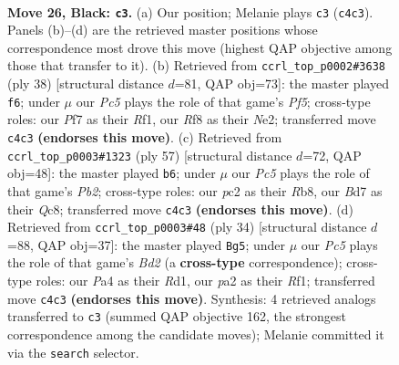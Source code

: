 \documentclass[11pt]{article}
\begin{document}
\clearpage

\begin{figure}[p]\centering
\begin{subfigure}{0.46\textwidth}\centering
\resizebox{\linewidth}{!}{%
\newchessgame
\chessboard[
  setfen={1n3rk1/1rqb1ppp/8/4Pp2/p1p2P2/8/PPP2KPP/1R2QBNR b - - 7 26},
  showmover=false,
  pgfstyle=straightmove, color=movearrow, markmove={c4-c3}
]}
\caption{}
\end{subfigure}\hfill
\begin{subfigure}{0.46\textwidth}\centering
\resizebox{\linewidth}{!}{%
\newchessgame
\chessboard[
  setfen={2bqr1k1/4bppp/r1p5/3pPP2/pp6/4P1B1/PPQRN1PP/5RK1 w - - 0 20},
  showmover=false,
  pgfstyle=straightmove, color=movearrow, markmove={f5-f6}
]}
\caption{}
\end{subfigure}
\\[4pt]
\begin{subfigure}{0.46\textwidth}\centering
\resizebox{\linewidth}{!}{%
\newchessgame
\chessboard[
  setfen={1rq1n1k1/1p1brpp1/7p/p1p1P3/5P1P/PPR3NP/1Q4BK/5R2 b - - 1 29},
  showmover=false,
  pgfstyle=straightmove, color=movearrow, markmove={b7-b6}
]}
\caption{}
\end{subfigure}\hfill
\begin{subfigure}{0.46\textwidth}\centering
\resizebox{\linewidth}{!}{%
\newchessgame
\chessboard[
  setfen={2r1k2r/2qnbpp1/p1bpp3/1p5p/4P2P/3B1P2/PPPBNQP1/1K1R1R2 w k - 4 18},
  showmover=false,
  pgfstyle=straightmove, color=movearrow, markmove={d2-g5}
]}
\caption{}
\end{subfigure}
\caption{\textbf{Move 26, Black: \texttt{c3}.} (a) Our position; Melanie plays \texttt{c3} (\texttt{c4c3}). Panels (b)--(d) are the retrieved master positions whose correspondence most drove this move (highest QAP objective among those that transfer to it). (b) Retrieved from \texttt{ccrl\_top\_p0002\#3638} (ply 38) [structural distance $d$=81, QAP obj=73]: the master played \texttt{f6}; under $\mu$ our \emph{Pc5} plays the role of that game's \emph{Pf5}; cross-type roles: our \emph{P}f7 as their \emph{R}f1, our \emph{R}f8 as their \emph{N}e2; transferred move \texttt{c4c3} \textbf{(endorses this move)}. (c) Retrieved from \texttt{ccrl\_top\_p0003\#1323} (ply 57) [structural distance $d$=72, QAP obj=48]: the master played \texttt{b6}; under $\mu$ our \emph{Pc5} plays the role of that game's \emph{Pb2}; cross-type roles: our \emph{p}c2 as their \emph{R}b8, our \emph{B}d7 as their \emph{Q}c8; transferred move \texttt{c4c3} \textbf{(endorses this move)}. (d) Retrieved from \texttt{ccrl\_top\_p0003\#48} (ply 34) [structural distance $d$=88, QAP obj=37]: the master played \texttt{Bg5}; under $\mu$ our \emph{Pc5} plays the role of that game's \emph{Bd2} (a \textbf{cross-type} correspondence); cross-type roles: our \emph{P}a4 as their \emph{R}d1, our \emph{p}a2 as their \emph{R}f1; transferred move \texttt{c4c3} \textbf{(endorses this move)}. Synthesis: 4 retrieved analogs transferred to \texttt{c3} (summed QAP objective 162, the strongest correspondence among the candidate moves); Melanie committed it via the \texttt{search} selector.}
\label{fig:thought-m51}
\end{figure}
\end{document}
